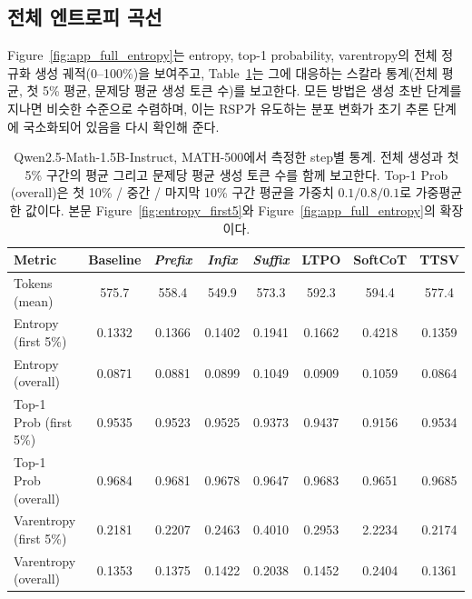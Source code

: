 \subsection{전체 엔트로피 곡선}\label{app:entropy_full}

Figure~\ref{fig:app_full_entropy}는 entropy, top-1 probability, varentropy의 전체 정규화 생성 궤적(0--100\%)을 보여주고, Table~\ref{tab:entropy_full}는 그에 대응하는 스칼라 통계(전체 평균, 첫 5\% 평균, 문제당 평균 생성 토큰 수)를 보고한다. 모든 방법은 생성 초반 단계를 지나면 비슷한 수준으로 수렴하며, 이는 RSP가 유도하는 분포 변화가 초기 추론 단계에 국소화되어 있음을 다시 확인해 준다.

\begin{table}[ht]
\centering
\caption{Qwen2.5-Math-1.5B-Instruct, MATH-500에서 측정한 step별 통계. 전체 생성과 첫 5\% 구간의 평균 그리고 문제당 평균 생성 토큰 수를 함께 보고한다. Top-1 Prob (overall)은 첫 10\% / 중간 / 마지막 10\% 구간 평균을 가중치 $0.1/0.8/0.1$로 가중평균한 값이다. 본문 Figure~\ref{fig:entropy_first5}와 Figure~\ref{fig:app_full_entropy}의 확장이다.}
\label{tab:entropy_full}
\footnotesize
\setlength{\tabcolsep}{4pt}
\renewcommand{\arraystretch}{0.9}
\begin{tabular}{lccccccc}
\toprule
\textbf{Metric} & \textbf{Baseline} & \cellcolor{blue!10}\textbf{\emph{Prefix}} & \cellcolor{blue!10}\textbf{\emph{Infix}} & \cellcolor{blue!10}\textbf{\emph{Suffix}} & \textbf{LTPO} & \textbf{SoftCoT} & \textbf{TTSV} \\
\midrule
Tokens (mean)            & 575.7  & \cellcolor{blue!10}558.4  & \cellcolor{blue!10}549.9  & \cellcolor{blue!10}573.3  & 592.3  & 594.4  & 577.4  \\
\midrule
Entropy (first 5\%)      & 0.1332 & \cellcolor{blue!10}0.1366 & \cellcolor{blue!10}0.1402 & \cellcolor{blue!10}0.1941 & 0.1662 & 0.4218 & 0.1359 \\
Entropy (overall)        & 0.0871 & \cellcolor{blue!10}0.0881 & \cellcolor{blue!10}0.0899 & \cellcolor{blue!10}0.1049 & 0.0909 & 0.1059 & 0.0864 \\
\midrule
Top-1 Prob (first 5\%)   & 0.9535 & \cellcolor{blue!10}0.9523 & \cellcolor{blue!10}0.9525 & \cellcolor{blue!10}0.9373 & 0.9437 & 0.9156 & 0.9534 \\
Top-1 Prob (overall)     & 0.9684 & \cellcolor{blue!10}0.9681 & \cellcolor{blue!10}0.9678 & \cellcolor{blue!10}0.9647 & 0.9683 & 0.9651 & 0.9685 \\
\midrule
Varentropy (first 5\%)   & 0.2181 & \cellcolor{blue!10}0.2207 & \cellcolor{blue!10}0.2463 & \cellcolor{blue!10}0.4010 & 0.2953 & 2.2234 & 0.2174 \\
Varentropy (overall)     & 0.1353 & \cellcolor{blue!10}0.1375 & \cellcolor{blue!10}0.1422 & \cellcolor{blue!10}0.2038 & 0.1452 & 0.2404 & 0.1361 \\
\bottomrule
\end{tabular}
\end{table}

